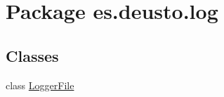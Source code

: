 \hypertarget{namespacees_1_1deusto_1_1log}{}\section{Package es.\+deusto.\+log}
\label{namespacees_1_1deusto_1_1log}
\subsection*{Classes}
\begin{DoxyCompactItemize}
\item 
class \hyperlink{classes_1_1deusto_1_1log_1_1_logger_file}{Logger\+File}
\end{DoxyCompactItemize}
